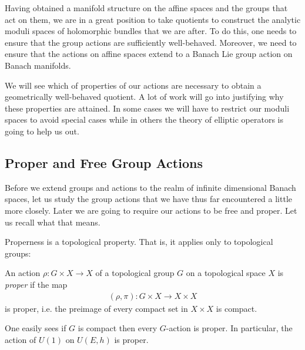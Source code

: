 \documentclass[12pt]{ociamthesis}  %
\begin{document}
Having obtained a manifold structure on the affine spaces and the groups
that act on them, we are in a great position to take quotients to construct
the analytic moduli spaces of holomorphic bundles that we are after. To do this,
one needs to ensure that the group actions are sufficiently well-behaved. Moreover,
we need to ensure that the actions on affine spaces extend to a Banach Lie group
action on Banach manifolds.

We will see which of properties of our actions are necessary to
obtain a geometrically well-behaved quotient. A lot of work will go into justifying why
these properties are attained. In some cases we will have to
restrict our moduli spaces to avoid special cases while in others
the theory of elliptic operators is going to help us out.

\subsection{Proper and Free Group Actions}

Before we extend groups and actions to the realm of infinite dimensional
Banach spaces, let us study the group actions that we have thus
far encountered a little more closely. Later we are going to require our
actions to be free and proper. Let us recall what that means.

Properness is a topological property. That is, it applies only to
topological groups:

\begin{definition}
  An action $\rho : G\times X\to X$ of a topological group $G$
  on a topological space $X$ is \emph{proper} if the map
  \begin{align}\label{eq:proper_map}
    (\rho,\pi) : G\times X \to X\times X
  \end{align}
  is proper, i.e. the preimage of every compact set in $X\times X$
  is compact.
\end{definition}

\begin{example}
  One easily sees if $G$ is compact then every $G$-action is proper.
  In particular, the action of $U(1)$ on $U(E,h)$ is
  proper.
\end{example}
\end{document}

